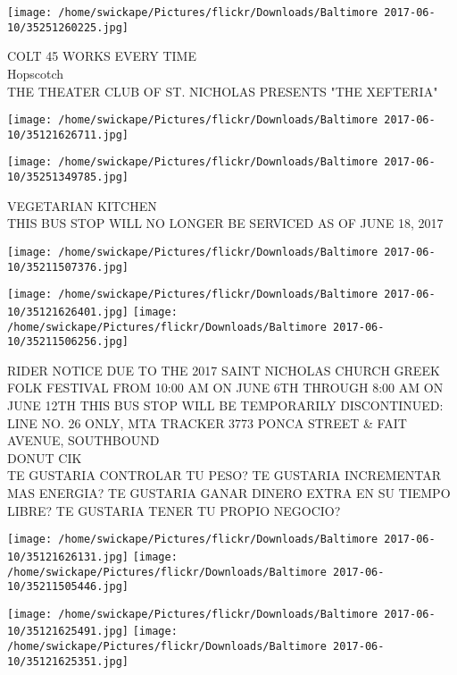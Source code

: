 \documentclass[10pt,letterpaper]{article}
\begin{document}
\texttt{[image: /home/swickape/Pictures/flickr/Downloads/Baltimore 2017-06-10/35251260225.jpg]}

COLT 45 WORKS EVERY TIME\\
Hopscotch\\
THE THEATER CLUB OF ST. NICHOLAS PRESENTS "THE XEFTERIA"\\
\pagebreak

\texttt{[image: /home/swickape/Pictures/flickr/Downloads/Baltimore 2017-06-10/35121626711.jpg]}

\vspace{0.25in}
\texttt{[image: /home/swickape/Pictures/flickr/Downloads/Baltimore 2017-06-10/35251349785.jpg]}

VEGETARIAN KITCHEN\\
THIS BUS STOP WILL NO LONGER BE SERVICED AS OF JUNE 18, 2017\\
\pagebreak

\texttt{[image: /home/swickape/Pictures/flickr/Downloads/Baltimore 2017-06-10/35211507376.jpg]}

\vspace{0.25in}
\texttt{[image: /home/swickape/Pictures/flickr/Downloads/Baltimore 2017-06-10/35121626401.jpg]}
\texttt{[image: /home/swickape/Pictures/flickr/Downloads/Baltimore 2017-06-10/35211506256.jpg]}

RIDER NOTICE DUE TO THE 2017 SAINT NICHOLAS CHURCH GREEK FOLK FESTIVAL FROM 10:00 AM ON JUNE 6TH THROUGH 8:00 AM ON JUNE 12TH THIS BUS STOP WILL BE TEMPORARILY DISCONTINUED: LINE NO. 26 ONLY, MTA TRACKER 3773 PONCA STREET \& FAIT AVENUE, SOUTHBOUND\\
DONUT CIK\\
TE GUSTARIA CONTROLAR TU PESO?  TE GUSTARIA INCREMENTAR MAS ENERGIA?  TE GUSTARIA GANAR DINERO EXTRA EN SU TIEMPO LIBRE?  TE GUSTARIA TENER TU PROPIO NEGOCIO?\\
\pagebreak

\texttt{[image: /home/swickape/Pictures/flickr/Downloads/Baltimore 2017-06-10/35121626131.jpg]}
\texttt{[image: /home/swickape/Pictures/flickr/Downloads/Baltimore 2017-06-10/35211505446.jpg]}

\texttt{[image: /home/swickape/Pictures/flickr/Downloads/Baltimore 2017-06-10/35121625491.jpg]}
\texttt{[image: /home/swickape/Pictures/flickr/Downloads/Baltimore 2017-06-10/35121625351.jpg]}
\end{document}
